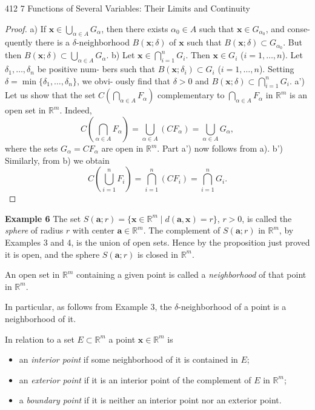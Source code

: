 412
\hfill 7 Functions of Several Variables: Their Limits and Continuity
\begin{proof} a) If $\mathbf{x} \in \bigcup_{\alpha \in A} G_\alpha$, then there exists $\alpha_0 \in A$ such that $\mathbf{x} \in G_{\alpha_0}$, and conse-
quently there is a $\delta$-neighborhood $B(\mathbf{x}; \delta)$ of $\mathbf{x}$ such that $B(\mathbf{x}; \delta) \subset G_{\alpha_0}$. But then
$B(\mathbf{x}; \delta) \subset \bigcup_{\alpha \in A} G_\alpha$.
b) Let $\mathbf{x} \in \bigcap_{i=1}^n G_i$. Then $\mathbf{x} \in G_i$ ($i = 1, \ldots, n$). Let $\delta_1, \ldots, \delta_n$ be positive num-
bers such that $B(\mathbf{x}; \delta_i) \subset G_i$ ($i = 1, \ldots, n$). Setting $\delta = \min\{\delta_1, \ldots, \delta_n\}$, we obvi-
ously find that $\delta > 0$ and $B(\mathbf{x}; \delta) \subset \bigcap_{i=1}^n G_i$.
a') Let us show that the set $C\left(\bigcap_{\alpha \in A} F_\alpha\right)$ complementary to $\bigcap_{\alpha \in A} F_\alpha$ in $\mathbb{R}^m$ is
an open set in $\mathbb{R}^m$.
Indeed,
$$
C\left(\bigcap_{\alpha \in A} F_\alpha\right) = \bigcup_{\alpha \in A} (C F_\alpha) = \bigcup_{\alpha \in A} G_\alpha,
$$
where the sets $G_\alpha = C F_\alpha$ are open in $\mathbb{R}^m$. Part a') now follows from a).
b') Similarly, from b) we obtain
$$
C\left(\bigcup_{i=1}^n F_i\right) = \bigcap_{i=1}^n (C F_i) = \bigcap_{i=1}^n G_i.
$$
\end{proof}

\textbf{Example 6} The set $S(\mathbf{a}; r) = \{\mathbf{x} \in \mathbb{R}^m \mid d(\mathbf{a}, \mathbf{x}) = r\}$, $r > 0$, is called the \emph{sphere} of
radius $r$ with center $\mathbf{a} \in \mathbb{R}^m$. The complement of $S(\mathbf{a}; r)$ in $\mathbb{R}^m$, by Examples 3
and 4, is the union of open sets. Hence by the proposition just proved it is open, and
the sphere $S(\mathbf{a}; r)$ is closed in $\mathbb{R}^m$.

\begin{definition} \label{def:neighborhood} An open set in $\mathbb{R}^m$ containing a given point is called a \emph{neighborhood}
of that point in $\mathbb{R}^m$.
\end{definition}

In particular, as follows from Example 3, the $\delta$-neighborhood of a point is a
neighborhood of it.

\begin{definition} \label{def:interior_exterior_boundary} In relation to a set $E \subset \mathbb{R}^m$ a point $\mathbf{x} \in \mathbb{R}^m$ is
\begin{itemize}
    \item an \emph{interior point} if some neighborhood of it is contained in $E$;
    \item an \emph{exterior point} if it is an interior point of the complement of $E$ in $\mathbb{R}^m$;
    \item a \emph{boundary point} if it is neither an interior point nor an exterior point.
\end{itemize}
\end{definition}

